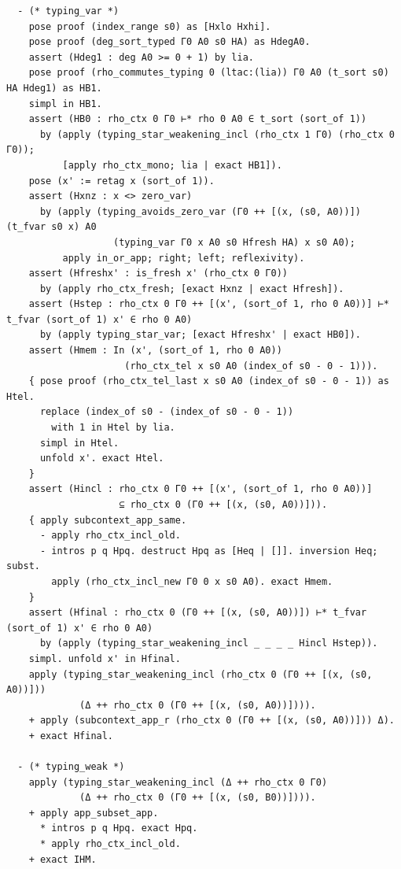 \begin{latin}
\begin{verbatim}
  - (* typing_var *)
    pose proof (index_range s0) as [Hxlo Hxhi].
    pose proof (deg_sort_typed Γ0 A0 s0 HA) as HdegA0.
    assert (Hdeg1 : deg A0 >= 0 + 1) by lia.
    pose proof (rho_commutes_typing 0 (ltac:(lia)) Γ0 A0 (t_sort s0) HA Hdeg1) as HB1.
    simpl in HB1.
    assert (HB0 : rho_ctx 0 Γ0 ⊢* rho 0 A0 ∈ t_sort (sort_of 1))
      by (apply (typing_star_weakening_incl (rho_ctx 1 Γ0) (rho_ctx 0 Γ0));
          [apply rho_ctx_mono; lia | exact HB1]).
    pose (x' := retag x (sort_of 1)).
    assert (Hxnz : x <> zero_var)
      by (apply (typing_avoids_zero_var (Γ0 ++ [(x, (s0, A0))]) (t_fvar s0 x) A0
                   (typing_var Γ0 x A0 s0 Hfresh HA) x s0 A0);
          apply in_or_app; right; left; reflexivity).
    assert (Hfreshx' : is_fresh x' (rho_ctx 0 Γ0))
      by (apply rho_ctx_fresh; [exact Hxnz | exact Hfresh]).
    assert (Hstep : rho_ctx 0 Γ0 ++ [(x', (sort_of 1, rho 0 A0))] ⊢* t_fvar (sort_of 1) x' ∈ rho 0 A0)
      by (apply typing_star_var; [exact Hfreshx' | exact HB0]).
    assert (Hmem : In (x', (sort_of 1, rho 0 A0))
                     (rho_ctx_tel x s0 A0 (index_of s0 - 0 - 1))).
    { pose proof (rho_ctx_tel_last x s0 A0 (index_of s0 - 0 - 1)) as Htel.
      replace (index_of s0 - (index_of s0 - 0 - 1))
        with 1 in Htel by lia.
      simpl in Htel.
      unfold x'. exact Htel.
    }
    assert (Hincl : rho_ctx 0 Γ0 ++ [(x', (sort_of 1, rho 0 A0))]
                    ⊆ rho_ctx 0 (Γ0 ++ [(x, (s0, A0))])).
    { apply subcontext_app_same.
      - apply rho_ctx_incl_old.
      - intros p q Hpq. destruct Hpq as [Heq | []]. inversion Heq; subst.
        apply (rho_ctx_incl_new Γ0 0 x s0 A0). exact Hmem.
    }
    assert (Hfinal : rho_ctx 0 (Γ0 ++ [(x, (s0, A0))]) ⊢* t_fvar (sort_of 1) x' ∈ rho 0 A0)
      by (apply (typing_star_weakening_incl _ _ _ _ Hincl Hstep)).
    simpl. unfold x' in Hfinal.
    apply (typing_star_weakening_incl (rho_ctx 0 (Γ0 ++ [(x, (s0, A0))]))
             (Δ ++ rho_ctx 0 (Γ0 ++ [(x, (s0, A0))]))).
    + apply (subcontext_app_r (rho_ctx 0 (Γ0 ++ [(x, (s0, A0))])) Δ).
    + exact Hfinal.

  - (* typing_weak *)
    apply (typing_star_weakening_incl (Δ ++ rho_ctx 0 Γ0)
             (Δ ++ rho_ctx 0 (Γ0 ++ [(x, (s0, B0))]))).
    + apply app_subset_app.
      * intros p q Hpq. exact Hpq.
      * apply rho_ctx_incl_old.
    + exact IHM.


\end{verbatim}
\end{latin}
